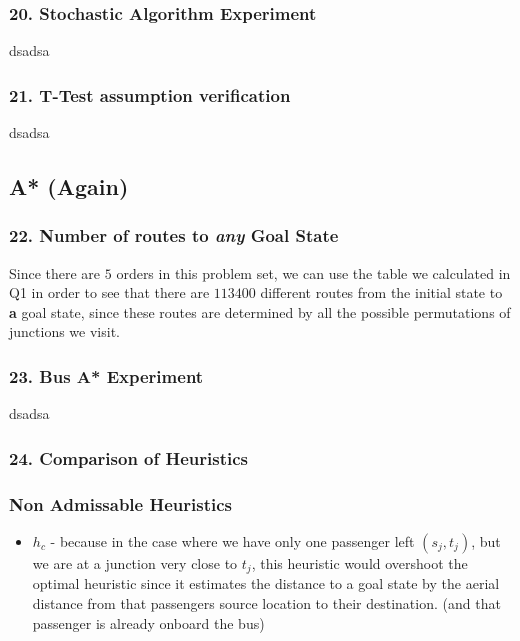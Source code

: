 \documentclass{article}
\begin{document}
\subsubsection*{20. Stochastic Algorithm Experiment}
dsadsa

\subsubsection*{21. T-Test assumption verification}
dsadsa

\subsection*{A* (Again)}
\subsubsection*{22. Number of routes to \emph{any} Goal State}
Since there are $5$ orders in this problem set, we can use the table we calculated in Q1 in order to see that there are $113400$ different routes from the initial state to \textbf{a} goal state, since these routes are determined by all the possible permutations of junctions we visit.

\subsubsection*{23. Bus A* Experiment}
dsadsa

\subsubsection*{24. Comparison of Heuristics}
\subsubsection*{Non Admissable Heuristics}
\begin{itemize}
\item $h_c$ - because in the case where we have only one passenger left $(s_j, t_j)$, but we are at a junction very close to $t_j$, this heuristic would overshoot the optimal heuristic since it estimates the distance to a goal state by the aerial distance from that passengers source location to their destination. (and that passenger is already onboard the bus)

\end{itemize}
\end{document}
